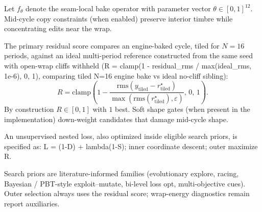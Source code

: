 Let $f_\theta$ denote the seam-local bake operator with parameter vector $\theta\in[0,1]^{12}$. Mid-cycle copy constraints (when enabled) preserve interior timbre while concentrating edits near the wrap.

The primary residual score compares an engine-baked cycle, tiled for $N=16$ periods, against an ideal multi-period reference constructed from the same seed with open-wrap cliffs withheld (R = clamp(1 - residual\_rms / max(ideal\_rms, 1e-6), 0, 1), comparing tiled N=16 engine bake vs ideal no-cliff sibling):
\begin{equation}
R=\mathrm{clamp}\!\left(1-\frac{\mathrm{rms}(y_{\mathrm{tiled}}-r^{\star}_{\mathrm{tiled}})}{\max(\mathrm{rms}(r^{\star}_{\mathrm{tiled}}),\varepsilon)},\,0,\,1\right).
\end{equation}
By construction $R\in[0,1]$ with $1$ best. Soft shape gates (when present in the implementation) down-weight candidates that damage mid-cycle shape.

An unsupervised nested loss, also optimized inside eligible search priors, is specified as: L = (1-D) + lambda(1-S); inner coordinate descent; outer maximize R.

Search priors are literature-informed families (evolutionary explore, racing, Bayesian / PBT-style exploit--mutate, bi-level loss opt, multi-objective cues). Outer selection always uses the residual score; wrap-energy diagnostics remain report auxiliaries.
